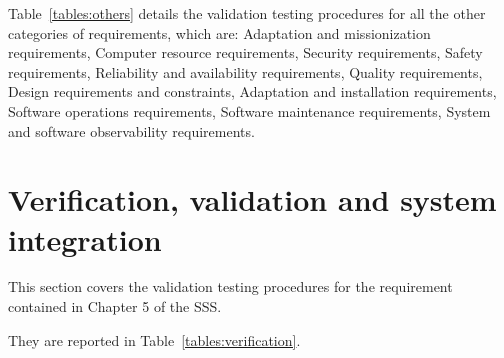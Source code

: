 Table~\ref{tables:others} details the validation testing procedures for all the other categories of requirements, which are:
Adaptation and missionization requirements, Computer resource requirements, Security requirements, Safety requirements, Reliability and availability requirements, Quality requirements, Design requirements and constraints, Adaptation and installation requirements, Software operations requirements, Software maintenance requirements, System and software observability requirements.




\clearpage

\section{Verification, validation and system integration}

This section covers the validation testing procedures for the requirement contained in Chapter 5 of the SSS.

They are reported in Table~\ref{tables:verification}.


